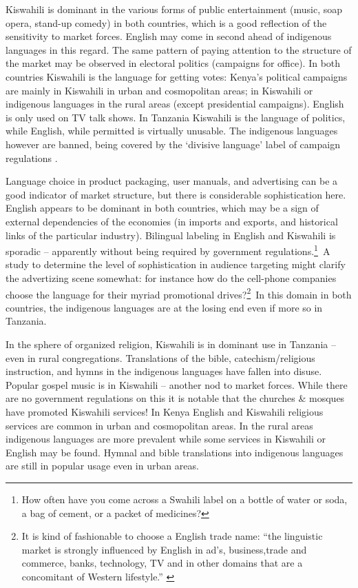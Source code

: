 \documentclass[output=paper,colorlinks,citecolor=brown]{langscibook}
\begin{document}
Kiswahili is dominant in the various forms of public entertainment (music, soap opera, stand-up comedy) in both countries, which is a good reflection of the sensitivity to market forces. English may come in second ahead of indigenous languages in this regard. The same pattern of paying attention to the structure of the market may be observed in electoral politics (campaigns for office). In both countries Kiswahili is the language for getting votes: Kenya’s political campaigns are mainly in Kiswahili in urban and cosmopolitan areas; in Kiswahili or indigenous languages in the rural areas (except presidential campaigns). English is only used on TV talk shows. In Tanzania Kiswahili is the language of politics, while English, while permitted is virtually unusable. The indigenous languages however are banned, being covered by the ‘divisive language’ label of campaign regulations \citep{Tanzania-Government2010}.

Language choice in product packaging, user manuals, and advertising can be a good indicator of market structure, but there is considerable sophistication here. English appears to be dominant in both countries, which may be a sign of external dependencies of the economies (in imports and exports, and historical links of the particular industry). Bilingual labeling in English and Kiswahili is sporadic – apparently without being required by government regulations.\footnote{How often have you come across a Swahili label on a bottle of water or soda, a bag of cement, or a packet of medicines?}~A study to determine the level of sophistication in audience targeting might clarify the advertizing scene somewhat: for instance how do the cell-phone companies choose the language for their myriad promotional drives?\footnote{It is kind of fashionable to choose a English trade name: “the linguistic market is strongly influenced by English in ad’s, business,trade and commerce, banks, technology, TV and in other domains that are a concomitant of Western lifestyle.” \citep[64]{Legere2010}}~In this domain in both countries, the indigenous languages are at the losing end even if more so in Tanzania. 

In the sphere of organized religion, Kiswahili is in dominant use in Tanzania – even in rural congregations.  Translations of the bible, catechism/religious instruction, and hymns in the indigenous languages have fallen into disuse.  Popular gospel music is in Kiswahili – another nod to market forces. While there are no government regulations on this it is notable that the churches \& mosques have promoted Kiswahili services! In Kenya English and Kiswahili religious services are common in urban and cosmopolitan areas. In the rural areas indigenous languages are more prevalent while some services in Kiswahili or English may be found. Hymnal and bible translations into indigenous languages are still in popular usage even in urban areas.
\end{document}
